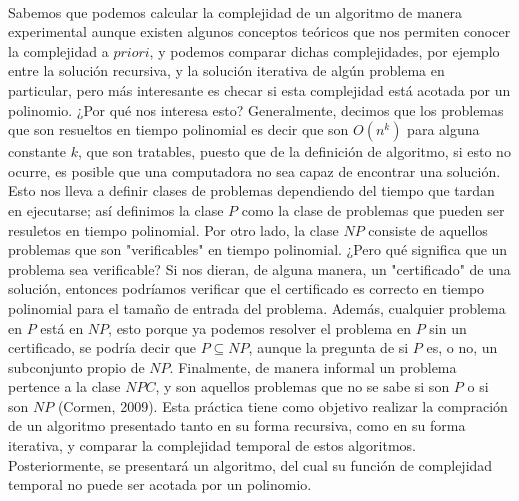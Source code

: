 \documentclass[12pt,twoside]{article}
\begin{document}
\\ Sabemos que podemos calcular la complejidad de un algoritmo de manera experimental aunque existen algunos conceptos teóricos que nos permiten conocer la complejidad a $priori$, y podemos comparar dichas complejidades, por ejemplo entre la solución recursiva, y la solución iterativa de algún problema en particular, pero más interesante es checar si esta complejidad está acotada por un polinomio.
¿Por qué nos interesa esto? Generalmente, decimos que los problemas que son resueltos en tiempo polinomial es decir que son $O(n^k)$ para alguna constante $k$, que son tratables, puesto que de la definición de algoritmo, si esto no ocurre, es posible que una computadora no sea capaz de encontrar una solución. Esto nos lleva a definir clases de problemas dependiendo del tiempo que tardan en ejecutarse; así definimos la clase $P$ como la clase de problemas que pueden ser resuletos en tiempo polinomial.
Por otro lado, la clase $NP$ consiste de aquellos problemas que son "verificables" en tiempo polinomial. ¿Pero qué significa que un problema sea verificable? Si nos dieran, de alguna manera, un "certificado" de una solución, entonces podríamos verificar que el certificado es correcto en tiempo polinomial para el tamaño de entrada del problema. Además, cualquier problema en $P$ está en $NP$, esto porque ya podemos resolver el problema en $P$ sin un certificado, se podría decir que $P \subseteq NP$, aunque la pregunta de si $P$ es, o no, un subconjunto propio de $NP$.
Finalmente, de manera informal un problema pertence a la clase $NPC$, y son aquellos problemas que no se sabe si son $P$ o si son $NP$ (Cormen, 2009).
\newpage
Esta práctica tiene como objetivo realizar la compración de un algoritmo presentado tanto en su forma recursiva, como en su forma iterativa, y comparar la complejidad temporal de estos algoritmos. Posteriormente, se presentará un algoritmo, del cual su función de complejidad temporal no puede ser acotada por un polinomio.  
\end{document}
